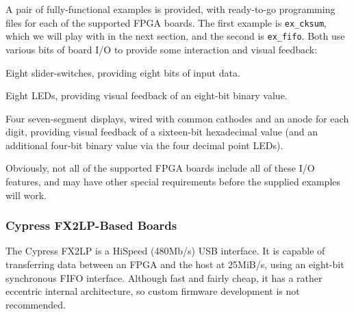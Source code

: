 A pair of fully-functional examples is provided, with ready-to-go programming files for each of the supported FPGA boards. The first example is \texttt{ex\_cksum}, which we will play with in the next section, and the second is \texttt{ex\_fifo}. Both use various bits of board I/O to provide some interaction and visual feedback:

\begin{blobs}
  \item
    Eight slider-switches, providing eight bits of input data.
  \item
    Eight LEDs, providing visual feedback of an eight-bit binary value.
  \item
    Four seven-segment displays, wired with common cathodes and an anode for each digit, providing visual feedback of a sixteen-bit hexadecimal value (and an additional four-bit binary value via the four decimal point LEDs).
\end{blobs}

Obviously, not all of the supported FPGA boards include all of these I/O features, and may have other special requirements before the supplied examples will work.

\subsubsection{Cypress FX2LP-Based Boards}

The Cypress FX2LP is a HiSpeed (480Mb/s) USB interface. It is capable of transferring data between an FPGA and the host at 25MiB/s, using an eight-bit synchronous FIFO interface. Although fast and fairly cheap, it has a rather eccentric internal architecture, so custom firmware development is not recommended.

